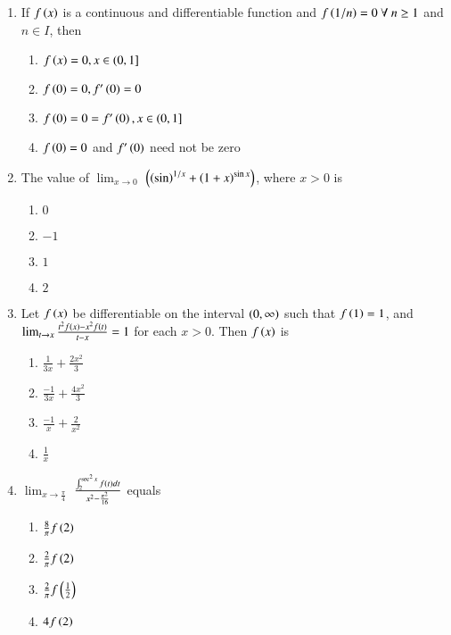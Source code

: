 \documentclass[journal,12pt,onecolumn]{IEEEtran}
\theoremstyle{remark}
\begin{document}
\begin{enumerate}
\item %

	If $f\left(x\right)$ is a continuous and differentiable function and $f\left(1/n\right)=0\ \forall\ n\geq1$ and$ n\in I$, then   \hfill{}
    \begin{enumerate}
	    \item $f\left(x\right)=0,x\in(0,1]$
	    \item $f\left(0\right)=0,f^{\prime}\left(0\right)=0$
	    \item $f\left(0\right)=0=f^{\prime}\left(0\right), x\in(0,1]$
	    \item $f\left(0\right)=0$ and $f^{\prime}\left(0\right)$ need not be zero\\
    \end{enumerate}


\item %

	The value of $\lim_{x \to 0}$ $\left( \left(\sin\right)^{1/x} + \left(1+x\right)^{\sin x}\right)$, where $x > 0$ is \hfill{}
    \begin{enumerate}
     \item $0$
     \item $-1$
     \item $1$
     \item $2$\\
    \end{enumerate}

\newpage
\item %

	Let $f\left(x\right)$ be differentiable on the interval $\left(0,\infty\right)$ such that $f\left(1\right)=1$, and $\lim_{t \to x} \frac{t^2f\left(x\right)-x^2f\left(t\right)}{t-x}=1$ for each $x>0$. Then $f\left(x\right)$ is \hfill{}
    \begin{enumerate}
     \item $\frac{1}{3x}+\frac{2x^2}{3}$\\
     \item $\frac{-1}{3x}+\frac{4x^2}{3}$\\
     \item $\frac{-1}{x}+\frac{2}{x^2}$\\
     \item $\frac{1}{x}$\\
    \end{enumerate}


\item %

	$\lim_{x \to \frac{\pi}{4}}$ $ \frac{\int_2^{\sec^2 x} f\left(t\right) dt}{x^2-\frac{\pi^2}{16}}$ equals \hfill{}
    \begin{enumerate}
	    \item $\frac{8}{\pi}f\left(2\right)$
     \item $\frac{2}{\pi}f\left(2\right)$
     \item $\frac{2}{\pi}f\left(\frac{1}{2}\right)$
     \item $4f\left(2\right)$\\
    \end{enumerate}


\end{enumerate}
\end{document}
